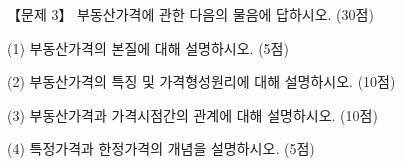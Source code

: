 \begin{longquestion}{【문제 3】}
부동산가격에 관한 다음의 물음에 답하시오. (30점) \par
\medskip\noindent (1) 부동산가격의 본질에 대해 설명하시오. (5점) \par
\medskip\noindent (2) 부동산가격의 특징 및 가격형성원리에 대해 설명하시오. (10점) \par
\medskip\noindent (3) 부동산가격과 가격시점간의 관계에 대해 설명하시오. (10점) \par
\medskip\noindent (4) 특정가격과 한정가격의 개념을 설명하시오. (5점) \par
\end{longquestion}
